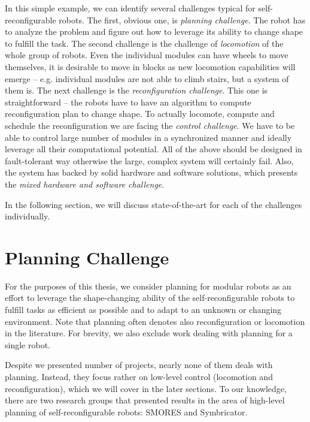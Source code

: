 In this simple example, we can identify several challenges typical for
self-reconfigurable robots. The first, obvious one, is \emph{planning
challenge}. The robot has to analyze the problem and figure out how to leverage
its ability to change shape to fulfill the task. The second challenge is the
challenge of \emph{locomotion} of the whole group of robots. Even the individual
modules can have wheels to move themselves, it is desirable to move in blocks as
new locomotion capabilities will emerge -- e.g. individual modules are not able
to climb stairs, but a system of them is. The next challenge is the
\emph{reconfiguration challenge}. This one is straightforward -- the robots have
to have an algorithm to compute reconfiguration plan to change shape. To
actually locomote, compute and schedule the reconfiguration we are facing the
\emph{control challenge}. We have to be able to control large number of modules
in a synchronized manner and ideally leverage all their computational potential.
All of the above should be designed in fault-tolerant way otherwise the large,
complex system will certainly fail. Also, the system has backed by solid
hardware and software solutions, which presents the \emph{mixed hardware and
software challenge}.

In the following section, we will discuss state-of-the-art for each of the
challenges individually.

\section{Planning Challenge}\label{sec:chal-planning}

For the purposes of this thesis, we consider planning for modular robots as an
effort to leverage the shape-changing ability of the self-reconfigurable robots
to fulfill tasks as efficient as possible and to adapt to an unknown or changing
environment. Note that planning often denotes also reconfiguration or locomotion
in the literature. For brevity, we also exclude work dealing with planning for a
single robot.

Despite we presented number of projects, nearly none of them deals with
planning. Instead, they focus rather on low-level control (locomotion and
reconfiguration), which we will cover in the later sections. To our knowledge,
there are two research groups that presented results in the area of high-level
planning of self-reconfigurable robots: SMORES and Symbricator.

